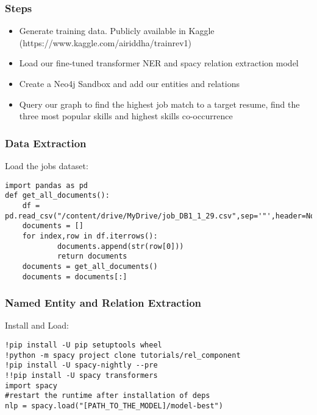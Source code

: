 \begin{frame}[fragile]\frametitle{Steps}

\begin{itemize}
\item Generate training data. Publicly available in Kaggle (https://www.kaggle.com/airiddha/trainrev1)
\item Load our fine-tuned transformer NER and spacy relation extraction model
\item Create a Neo4j Sandbox and add our entities and relations
\item Query our graph to find the highest job match to a target resume, find the three most popular skills and highest skills co-occurrence
\end{itemize}
	  
\end{frame}


\begin{frame}[fragile]\frametitle{Data Extraction}

Load the jobs dataset:


\begin{lstlisting}
import pandas as pd
def get_all_documents():
	df = pd.read_csv("/content/drive/MyDrive/job_DB1_1_29.csv",sep='"',header=None)
	documents = []
	for index,row in df.iterrows():
			documents.append(str(row[0]))
			return documents
	documents = get_all_documents()
	documents = documents[:]
\end{lstlisting}
	  
\end{frame}

\begin{frame}[fragile]\frametitle{Named Entity and Relation Extraction}

Install and Load:


\begin{lstlisting}
!pip install -U pip setuptools wheel
!python -m spacy project clone tutorials/rel_component
!pip install -U spacy-nightly --pre
!!pip install -U spacy transformers
import spacy
#restart the runtime after installation of deps
nlp = spacy.load("[PATH_TO_THE_MODEL]/model-best")
\end{lstlisting}
	  
\end{frame}


